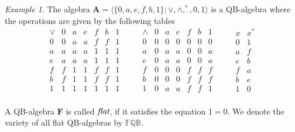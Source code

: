 \documentclass[12pt]{amsart}
\theoremstyle{definition}
\theoremstyle{remark}
\newtheorem{example}{Example}[section]
\numberwithin{equation}{section}
\begin{document}
\begin{example}\label{Example A}
The algebra $\mathbf{A} = \langle \{0,a,e,f,b,1\} ; \vee ,\wedge ,^\ast, 0, 1 \rangle$ is a QB-algebra where the operations are given by the following tables
$$
\begin{array}{c|cccccc}
\vee & 0   & a   & e   & f   & b   & 1   \\ \hline 0   & 0   & a   & a   & f   & f   & 1   \\a   & a   & a   & a   & 1   & 1   & 1   \\e   & a   & a   & a   & 1   & 1   & 1   \\f   & f   & 1   & 1   & f   & f   & 1   \\b   & f   & 1   & 1   & f   & f   & 1   \\1   & 1   & 1   & 1   & 1   & 1   & 1   \\
\end{array}
\qquad
\begin{array}{c|cccccc}
\wedge & 0   & a   & e   & f   & b   & 1   \\ \hline0   & 0   & 0   & 0   & 0   & 0   & 0   \\a   & 0   & a   & a   & 0   & 0   & a   \\e   & 0   & a   & a   & 0   & 0   & a   \\f   & 0   & 0   & 0   & f   & f   & f   \\b   & 0   & 0   & 0   & f   & f   & f   \\1   & 0   & a   & a   & f   & f   & 1   \\
\end{array}
\qquad
\begin{array}{c|c}
x & x^{*} \\ \hline 0 & 1   \\a & f   \\e & b   \\f & a   \\b & e   \\1 & 0   \\
\end{array}
$$
\end{example}



A QB-algebra $\mathbf{F}$ is called $\emph{flat}$, if it satisfies the equation $1=0$. We denote the variety of all flat QB-algebras by $\mathbb{FQB}$.
\end{document}

